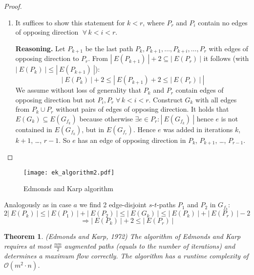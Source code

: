 \documentclass{article}
\newtheorem{theorem}{Theorem}
\newcommand{\card}[1]{\left|\:\!#1\:\!\right|}
\newcommand{\gath}[2]{$#1$-$#2$-path} %
\newcommand{\fall}{\;\forall\,}
\begin{document}
\begin{proof}
\begin{enumerate}
    \item
      It suffices to show this statement for $k < r$, where $P_r$ and $P_i$ contain no edges of opposing direction $\fall k < i < r$.

      \textbf{Reasoning.} Let $P_{k+1}$ be the last path $P_k, P_{k+1}, \ldots, P_{k+i}, \ldots, P_r$ with edges of opposing direction to $P_r$.
      From $\card{E(P_{k+1})} + 2 \subseteq \card{E(P_r)}$ it follows (with $\card{E(P_k)} \leq \card{E(P_{k+1})}$):
      \[
        \card{E(P_k)} + 2 \leq \card{E(P_{k+1}) + 2 \leq  \card{E(P_r)}}
      \]
      We assume without loss of generality that $P_k$ and $P_r$ contain edges of opposing direction but not $P_i, P_r \fall k < i < r$.
      Construct $G_k$ with all edges from $P_k \cup P_r$ without pairs of edges of opposing direction. It holds that $E(G_k) \subseteq E(G_{f_k})$ because otherwise $\exists e \in P_r: \card{E(G_{f_k})}$ hence $e$ is not contained in $E(G_{f_k})$, but in $E(G_{f_r})$. Hence $e$ was added in iterations $k$, $k+1$, \dots, $r-1$. So $e$ has an edge of opposing direction in $P_k$, $P_{k+1}$, \dots, $P_{r-1}$.
  \end{enumerate}
\end{proof}

\begin{figure}[h]
 \begin{center}
  \texttt{[image: ek\_algorithm2.pdf]}
  \caption{Edmonds and Karp algorithm}
 \end{center}
\end{figure}

Analogously as in case $a$ we find 2 edge-disjoint \gath sts $P_1$ and $P_2$ in $G_{f_k}$:
\[
  2 \card{E(P_k)} \leq \card{E(P_1)} + \card{E(P_2)} \leq \card{E(G_k)} \leq \card{E(P_k)} + \card{E(P_r)} - 2
\] \[
  \Rightarrow \card{E(P_k)} + 2 \leq \card{E(P_r)}
\]

\begin{theorem}\label{satz-4.6}
  (Edmonds and Karp, 1972)
  The algorithm of Edmonds and Karp requires at most $\frac{nm}2$ augmented paths (equals to the number of iterations) and determines a maximum flow correctly. The algorithm has a runtime complexity of $\mathcal{O}(m^2 \cdot n)$.
\end{theorem}
\end{document}
